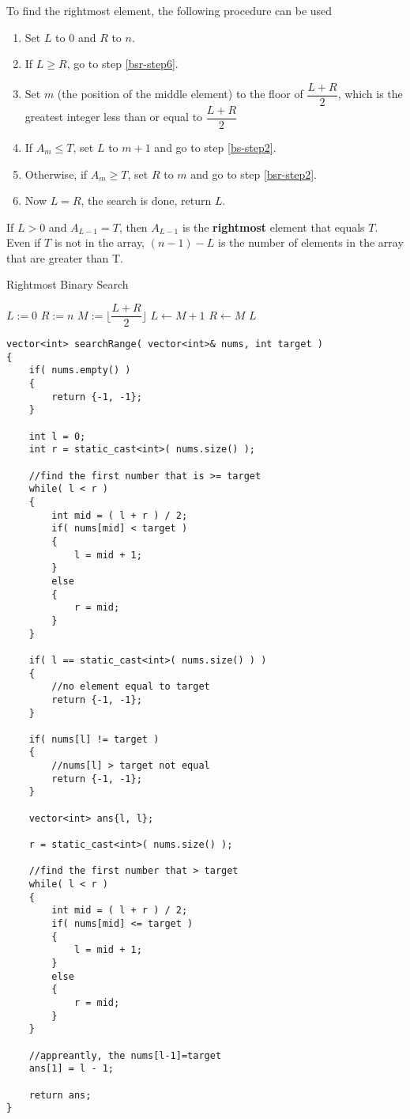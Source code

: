 To find the rightmost element, the following procedure can be used
\begin{enumerate}
    \item Set $L$ to 0 and $R$ to $n$.
    \item If $L \geq R$, go to step \ref{bsr-step6}. \label{bsr-step2}
    \item Set $m$ (the position of the middle element) to the floor of $\dfrac{L + R}{2}$, which is the greatest integer less than or equal to $\dfrac{L + R}{2}$
    \item If $A_m \leq T$, set $L$ to $m + 1$ and go to step \ref{bs-step2}.
    \item Otherwise, if $A_m \geq T$, set $R$ to $m$ and go to step \ref{bsr-step2}.
    \item Now $L = R$, the search is done, return $L$. \label{bsr-step6}
\end{enumerate}
If $L > 0$ and $A_{L-1} = T$, then $A_{L-1}$ is the \textbf{rightmost} element that equals $T$. Even if $T$ is not in the array, $(n - 1) - L$ is the number of elements in the array that are greater than T.
\begin{algorithm}[H]
\caption{Rightmost Binary Search}
\begin{algorithmic}[1]
\State $L := 0$
\State $R := n$
\State $M := \lfloor\dfrac{L+R}{2}\rfloor$
\State $L\gets M+1$
\Else
\State $R\gets M$
\EndIf
\EndWhile
\State \Return $L$
\EndFunction
\end{algorithmic}
\end{algorithm}

\setcounter{lstlisting}{0}
\begin{lstlisting}[style=customc, caption={Leftmost And Rightmost Binary Search}]
vector<int> searchRange( vector<int>& nums, int target )
{
    if( nums.empty() )
    {
        return {-1, -1};
    }

    int l = 0;
    int r = static_cast<int>( nums.size() );

    //find the first number that is >= target
    while( l < r )
    {
        int mid = ( l + r ) / 2;
        if( nums[mid] < target )
        {
            l = mid + 1;
        }
        else
        {
            r = mid;
        }
    }

    if( l == static_cast<int>( nums.size() ) )
    {
        //no element equal to target
        return {-1, -1};
    }

    if( nums[l] != target )
    {
        //nums[l] > target not equal
        return {-1, -1};
    }

    vector<int> ans{l, l};

    r = static_cast<int>( nums.size() );

    //find the first number that > target
    while( l < r )
    {
        int mid = ( l + r ) / 2;
        if( nums[mid] <= target )
        {
            l = mid + 1;
        }
        else
        {
            r = mid;
        }
    }

    //appreantly, the nums[l-1]=target
    ans[1] = l - 1;

    return ans;
}
\end{lstlisting}
